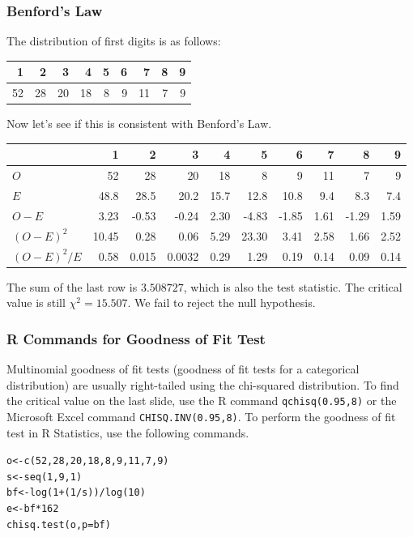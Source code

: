 \documentclass[xcolor=dvipsnames]{beamer}
\begin{document}
\begin{frame}
  \frametitle{Benford's Law}
  The distribution of first digits is as follows:
  \begin{tabular}{|r|r|r|r|r|r|r|r|r|}\hline
   1 & 2 & 3 & 4 & 5 & 6 &  7 & 8 & 9 \\ \hline
   52 & 28 & 20 & 18 & 8 & 9 & 11 & 7 &  9 \\ \hline
  \end{tabular}

\bigskip

  Now let's see if this is consistent with Benford's Law.

\bigskip

\begin{scriptsize}
  \begin{tabular}{|l|r|r|r|r|r|r|r|r|r|}\hline
                 & 1     & 2     & 3     & 4    & 5     & 6     & 7    & 8     & 9    \\ \hline
   $O$           & 52    & 28    & 20    & 18   & 8     & 9     & 11   & 7     & 9    \\ \hline
   $E$           & 48.8  & 28.5  & 20.2  & 15.7 & 12.8  & 10.8  & 9.4  & 8.3   & 7.4  \\ \hline
   $O-E$         & 3.23  & -0.53 & -0.24 & 2.30 & -4.83 & -1.85 & 1.61 & -1.29 & 1.59 \\ \hline
   $(O-E)^{2}$   & 10.45 &  0.28 &  0.06 &  5.29 & 23.30 & 3.41 & 2.58 & 1.66 & 2.52 \\ \hline
   $(O-E)^{2}/E$ & 0.58 & 0.015 & 0.0032 & 0.29 & 1.29 & 0.19 & 0.14 & 0.09 & 0.14 \\ \hline
  \end{tabular}
\end{scriptsize}

\bigskip

The sum of the last row is $3.508727$, which is also the test
statistic. The critical value is still $\chi^{2}=15.507$. We fail
to reject the null hypothesis.
\end{frame}

\begin{frame}[fragile]
  \frametitle{R Commands for Goodness of Fit Test}
Multinomial goodness of fit tests (goodness of fit tests for a
categorical distribution) are usually right-tailed using the
chi-squared distribution. To find the critical value on the last
slide, use the R command \texttt{qchisq(0.95,8)} or the Microsoft
Excel command \texttt{CHISQ.INV(0.95,8)}. To perform the
goodness of fit test in R Statistics, use the following commands.
\begin{alltt}
o<-c(52,28,20,18,8,9,11,7,9) 
s<-seq(1,9,1) 
bf<-log(1+(1/s))/log(10) 
e<-bf*162 
chisq.test(o,p=bf)
\end{alltt}
\end{frame}
\end{document}
